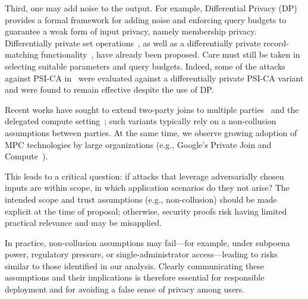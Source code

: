 Third, one may add noise to the output. For example, Differential Privacy
(DP)~\cite{TCC:DMNS06} provides a formal framework for adding noise and
enforcing query budgets to guarantee a weak form of input privacy, namely
membership privacy. Differentially private set
operations~\cite{EUROSP:KKLNSSBSOK20}, as well as a differentially private
record-matching functionality~\cite{DP-Match}, have already been proposed. Care
must still be taken in selecting suitable parameters and query budgets. Indeed,
some of the attacks against PSI-CA in~\cite{NDSS:JiaDuYan24} were evaluated
against a differentially private PSI-CA variant and were found to remain
effective despite the use of DP.

 Recent works have sought to extend
two-party joins to multiple parties~\cite{CCS:MohRinRos20,PoPETS:LehMouSid26}
and the delegated compute setting~\cite{PoPETS:MMTSBC24}; such variants
typically rely on a non-collusion assumptions between parties. At the same time,
we observe growing adoption of MPC technologies by large organizations (e.g.,
Google's Private Join and Compute~\cite{EuroSP:IKNPSS20}).

This leads to a critical question: if attacks that leverage adversarially chosen
inputs are within scope, in which application scenarios do they not arise? The
intended scope and trust assumptions (e.g., non-collusion) should be made
explicit at the time of proposal; otherwise, security proofs risk having limited
practical relevance and may be misapplied.

In practice, non-collusion assumptions may fail---for example, under subpoena
power, regulatory pressure, or single-administrator access---leading to risks
similar to those identified in our analysis. Clearly communicating these
assumptions and their implications is therefore essential for responsible
deployment and for avoiding a false sense of privacy among users.